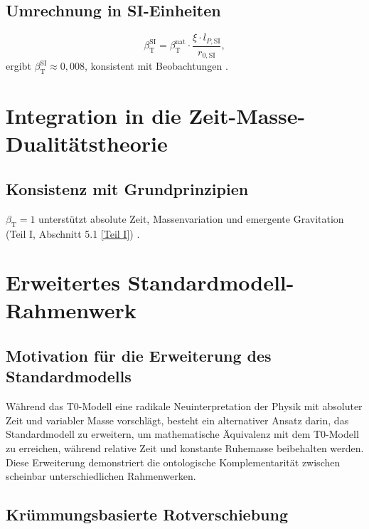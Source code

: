 \documentclass[twocolumn,aps,prl]{revtex4-2}
\newcommand{\betaT}{\beta_{\text{T}}}
\begin{document}
	\subsection{Umrechnung in SI-Einheiten}
	\label{subsec:conversion_si}
	
	\begin{equation}
		\betaT^{\text{SI}} = \betaT^{\text{nat}} \cdot \frac{\xi \cdot l_{P,\text{SI}}}{r_{0,\text{SI}}},
		\label{eq:beta_conversion}
	\end{equation}
	ergibt \(\betaT^{\text{SI}} \approx 0,008\), konsistent mit Beobachtungen \cite{pascher_alphabeta_2025}.
	
	\section{Integration in die Zeit-Masse-Dualitätstheorie}
	\label{sec:integration_t0}
	
	\subsection{Konsistenz mit Grundprinzipien}
	\label{subsec:consistency_principles}
	
	\(\betaT = 1\) unterstützt absolute Zeit, Massenvariation und emergente Gravitation (Teil I, Abschnitt 5.1 \href{https://github.com/jpascher/T0-Time-Mass-Duality/tree/main/2/pdf/Deutsch/QMRelTimeMassPart1.pdf}{[Teil I]}) \cite{pascher_lagrange_2025}.
	
	\section{Erweitertes Standardmodell-Rahmenwerk}
	\label{sec:extended_standard_model}
	
	\subsection{Motivation für die Erweiterung des Standardmodells}
	\label{subsec:extended_sm_motivation}
	
	Während das T0-Modell eine radikale Neuinterpretation der Physik mit absoluter Zeit und variabler Masse vorschlägt, besteht ein alternativer Ansatz darin, das Standardmodell zu erweitern, um mathematische Äquivalenz mit dem T0-Modell zu erreichen, während relative Zeit und konstante Ruhemasse beibehalten werden. Diese Erweiterung demonstriert die ontologische Komplementarität zwischen scheinbar unterschiedlichen Rahmenwerken.
	
	\subsection{Krümmungsbasierte Rotverschiebung}
	\label{subsec:curvature_redshift}
	
\end{document}
